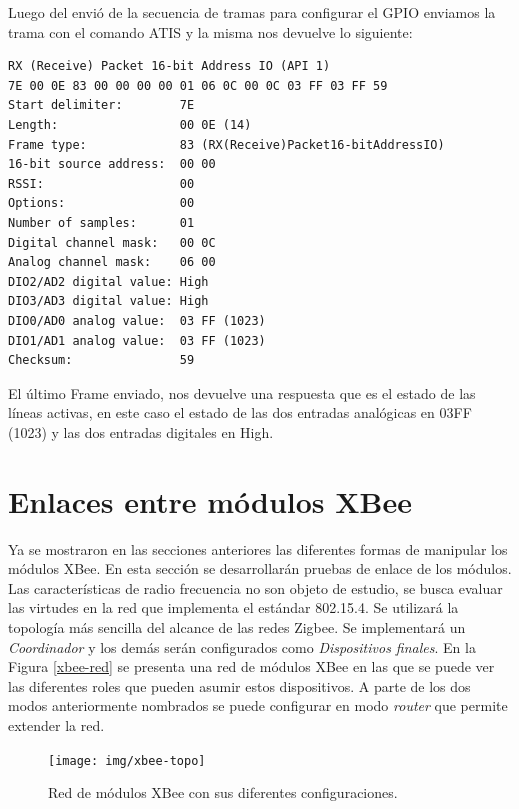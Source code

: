 \documentclass[11pt,oneside,spanish,a4paper]{article}
\begin{document}
Luego del envió de la secuencia de tramas para configurar el GPIO enviamos la trama con el comando ATIS y la misma nos devuelve lo siguiente:
\begin{lstlisting}[emph={RX,(,Receive,),Packet,16,-,bit,Address,IO,(API, 1),Start,delimiter:,Length:,Frame, type:,16-bit, source, address:, RSSI:,Options:,Number, of, samples:,Digital, channel, mask:,Analog ,channel mask: ,DIO2/AD2, digital, value: ,DIO3/AD3, DIO0/AD0, analog}, emphstyle={\color{black}}, label=code:apiEjempl-id]
RX (Receive) Packet 16-bit Address IO (API 1)
7E 00 0E 83 00 00 00 00 01 06 0C 00 0C 03 FF 03 FF 59
Start delimiter:        7E
Length:                 00 0E (14)
Frame type:             83 (RX(Receive)Packet16-bitAddressIO)
16-bit source address:  00 00
RSSI:                   00
Options:                00
Number of samples:      01
Digital channel mask:   00 0C
Analog channel mask:    06 00
DIO2/AD2 digital value: High
DIO3/AD3 digital value: High
DIO0/AD0 analog value:  03 FF (1023)
DIO1/AD1 analog value:  03 FF (1023)
Checksum:               59
\end{lstlisting} 
El último Frame enviado, nos devuelve una respuesta que es el estado
de las líneas activas, en este caso el estado de las dos entradas
analógicas en 03FF (1023) y las dos entradas digitales en High.



\section{Enlaces entre módulos XBee}
\label{sec:enlace}

Ya se mostraron en las secciones anteriores las diferentes formas de
manipular los módulos XBee. En esta sección se desarrollarán pruebas
de enlace de los módulos. Las características de radio frecuencia no
son objeto de estudio, se busca evaluar las virtudes en la red que
implementa el estándar 802.15.4. Se utilizará la topología más
sencilla del alcance de las redes Zigbee. Se implementará un
\emph{Coordinador} y los demás serán configurados como
\emph{Dispositivos finales}. En la Figura \ref{xbee-red} se presenta
una red de módulos XBee en las que se puede ver las diferentes
roles que pueden asumir estos dispositivos. A parte de los dos modos
anteriormente nombrados se puede configurar en modo \emph{router} que
permite extender la red. 

\begin{figure}[h]
  \centering
  \texttt{[image: img/xbee-topo]}
  \caption{Red de módulos XBee con sus diferentes configuraciones.}
  \label{fig:xbee-red}
\end{figure}
\end{document}
